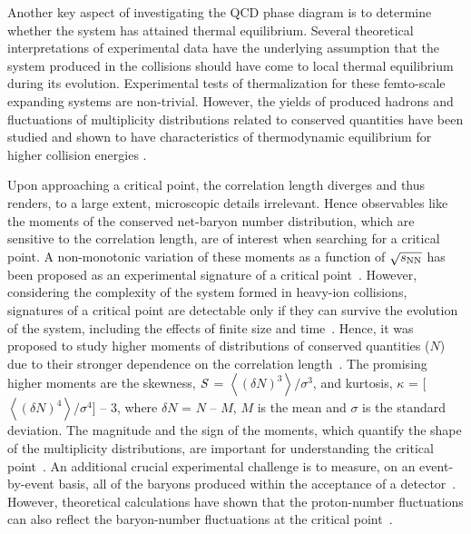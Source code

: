 \documentclass[10pt,aps,prc,twocolumn,floatfix]{revtex4-1}
\newcommand{\rootsnn} {\mbox{$\sqrt{s_{\rm NN}}$}\xspace}
\begin{document}
Another key aspect of investigating the QCD phase diagram is to determine whether the system has attained thermal
equilibrium. Several theoretical interpretations of experimental data have the underlying assumption that
the system produced in the collisions should have come to local thermal equilibrium during
its evolution. Experimental tests of thermalization for
these femto-scale expanding systems are non-trivial.  However, the
yields of produced hadrons and fluctuations of multiplicity
distributions related to conserved quantities have been studied and
shown to have characteristics of thermodynamic equilibrium for higher
collision energies \cite{Bazavov:2017tot, Adamczyk:2017iwn,
  Andronic:2017pug, Almasi:2017bhq, Bazavov:2012vg, Borsanyi:2014ewa, Gupta:2020pjd}.

Upon approaching a critical point,
the correlation length diverges and thus 
renders, to a large extent, microscopic details irrelevant.  Hence 
observables like  the moments of the conserved net-baryon number
distribution, which are sensitive to the correlation length,
are of interest when searching for a critical point.
A non-monotonic variation of these moments as a function of \rootsnn has been proposed as 
an experimental signature of a critical point~\cite{Stephanov:1999zu,Stephanov:2011pb}. 
However, considering the complexity of
the system formed in heavy-ion collisions, signatures of a critical point are
detectable only if they can
survive the evolution of the system, including the effects of finite size and time~\cite{Berdnikov:1999ph}.
Hence, it was proposed to study higher moments of distributions of 
conserved quantities ($N$) 
due to their stronger dependence on the correlation length~\cite{Stephanov:2008qz}. 
The promising higher moments are the skewness, 
${\it {S}}$ = $\left\langle (\delta N)^3 \right\rangle/\sigma^{3}$,
and kurtosis, $\kappa$ = [$\left\langle (\delta N)^4 \right\rangle/\sigma^{4}$] -- 3,
where $\delta N$ = $N$ -- $M$, $M$
is the mean and $\sigma$ is the standard deviation.
The magnitude and the sign of the moments, which quantify the shape of the multiplicity
distributions, are important for understanding the critical point~\cite{Stephanov:2011pb,Asakawa:2009aj}. An additional
crucial experimental challenge is to measure, on an event-by-event basis,
all of the baryons produced within the acceptance of a detector~\cite{Kitazawa:2012at,Bzdak:2012ab,Bzdak:2012an}. However,
theoretical calculations 
have shown that the proton-number fluctuations can also
reflect the baryon-number fluctuations at the critical
point~\cite{Hatta:2003wn, Kitazawa:2012at}.
\end{document}

